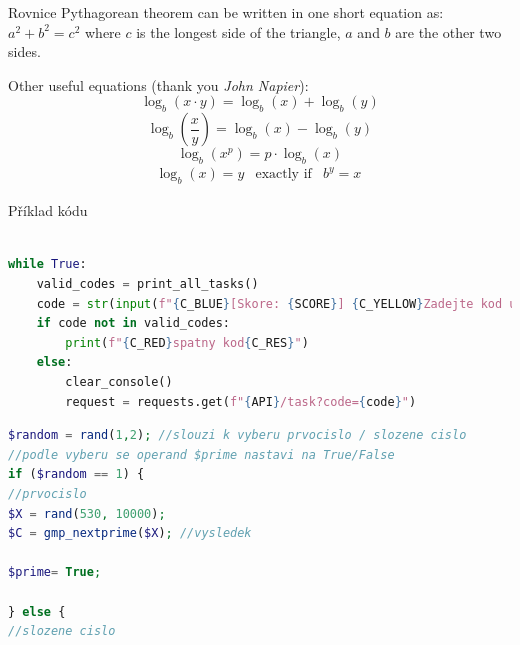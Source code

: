 \documentclass[aspectratio=1610]{beamer}
\begin{document}
\begin{frame}{Rovnice}
    Pythagorean theorem can be written in one short equation as: $a^2 + b^2 = c^2$ where $c$ is the longest side of the triangle, $a$ and $b$ are the other two sides.

    \vfill %

    Other useful equations (thank you \textit{John Napier}):
    \begin{equation}
        \log_b (x\cdot y) = \log_b (x) + \log_b (y)
    \end{equation}
    \begin{equation}
        \log_b \left( \frac{x}{y} \right) = \log_b (x) - \log_b (y)
    \end{equation}
    \begin{equation}
        \log_b (x^p) = p\cdot \log_b (x)
    \end{equation}
    \begin{eqnarray}
        \log_b(x) = y & \text{exactly if} & b^y = x\
    \end{eqnarray}
\end{frame}

\begin{frame}[fragile]{Příklad kódu}

\begin{lstlisting}[language=python,title={Příklad Python kódu}]

while True:
    valid_codes = print_all_tasks()
    code = str(input(f"{C_BLUE}[Skore: {SCORE}] {C_YELLOW}Zadejte kod ulohy, kterou si prejete resit:{C_RES}"))
    if code not in valid_codes:
        print(f"{C_RED}spatny kod{C_RES}")
    else:    
        clear_console()
        request = requests.get(f"{API}/task?code={code}")
\end{lstlisting}
    \vfill

\begin{lstlisting}[language=php,title={Příklad PHP kódu}]
$random = rand(1,2); //slouzi k vyberu prvocislo / slozene cislo
//podle vyberu se operand $prime nastavi na True/False
if ($random == 1) {
//prvocislo
$X = rand(530, 10000);
$C = gmp_nextprime($X); //vysledek

$prime= True;

} else {
//slozene cislo
\end{lstlisting}


\end{frame}
\end{document}
